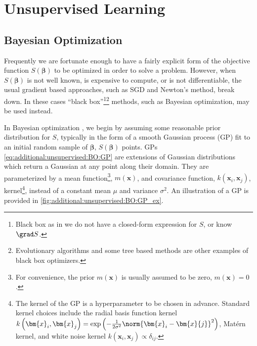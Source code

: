 \section{Unsupervised Learning}
\label{additional:unsupervised}

\subsection{Bayesian Optimization}
\label{additional:unsupervised:BO}

Frequently we are fortunate enough to have a fairly explicit form of
the objective function $S\left(\bm{\beta}\right)$ to be optimized in order to solve a problem.
However, when $S\left(\bm{\beta}\right)$ is not well known, is expensive to compute, or is not differentiable,
the usual gradient based approaches, such as SGD and Newton's method, break down.
In these cases ``black box''\footnote{Black box as in
we do not have a closed-form expression for $S$, or know $\grad S$.}\footnote{Evolutionary algorithms
and some tree based methods \cite{Hutter2011,Hutter2014}
are other examples of black box optimizers.} methods,
such as Bayesian optimization, may be used instead.

In Bayesian optimization \cite{Brochu2010,1301.1942,Borisyak},
we begin by assuming some reasonable prior distribution for $S$,
typically in the form of a smooth Gaussian process (GP) fit
to an initial random sample of $\bm{\beta}$, $S\left(\bm{\beta}\right)$ points.
GPs \cref{eq:additional:unsupervised:BO:GP} are
extensions of Gaussian distributions which return a Gaussian at any point along their domain.
They are parameterized by a mean function\footnote{For convenience,
the prior $m\left(\bm{x}\right)$ is usually assumed to be zero, $m\left(\bm{x}\right)=0$.}, $m\left(\bm{x}\right)$,
and covariance function, $k\left(\bm{x}_{i}, \bm{x}_{j}\right)$,
\ie kernel\footnote{The kernel of the GP is a hyperparameter to be chosen in advance.
Standard kernel choices include
the radial basis function kernel $k\left(\bm{x}_{i}, \bm{x}_{j}\right) = \exp\left(-\frac{1}{2\sigma^{2}}\norm{\bm{x}_{i}-\bm{x}{j}}^{2}\right)$,
Mat\'{e}rn kernel,
and white noise kernel $k\left(\bm{x}_{i}, \bm{x}_{j}\right) \propto \delta_{ij}$.},
instead of a constant mean $\mu$ and variance $\sigma^{2}$.
An illustration of a GP is provided in \cref{fig:additional:unsupervised:BO:GP_ex}.

